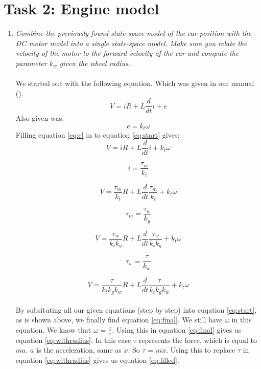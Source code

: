 \documentclass[final]{scrreprt} %
\begin{document}
\section{Task 2: Engine model}
\label{sec:mod3-tsk2}
\begin{enumerate}
\item \textit{Combine the previously found state-space model of the car position with the DC motor model into a single state-space model. Make sure you relate the velocity of the motor to the forward velocity of the car and compute the parameter $k_{w}$ given the wheel radius.}\\
\\
We started out with the following equation. Which was given in our manual (\cite{epo4-manual}).
\begin{equation}
V = iR + L\frac{d}{dt}i + e
\label{eq:start}
\end{equation}
Also given was:
\begin{equation}
e = k_t \omega
\label{eq:e}
\end{equation}
Filling equation \ref{eq:e} in to equation \ref{eq:start} gives: 
\begin{equation}
V = iR + L\frac{d}{dt}i + k_t \omega
\label{eq:1}
\end{equation}

\begin{equation}
i = \frac{\tau_m}{k_t}
\label{eq:2}
\end{equation}

\begin{equation}
V = \frac{\tau_m}{k_t}R + L\frac{d}{dt}\frac{\tau_m}{k_t} +  k_t \omega
\label{eq:3}
\end{equation}

\begin{equation}
\tau_m = \frac{\tau_w}{k_g}
\label{eq:4}
\end{equation}

\begin{equation}
V = \frac{\tau_w}{k_t k_g}R + L\frac{d}{dt}\frac{\tau_w}{k_t k_g} +  k_t \omega
\label{eq:5}
\end{equation}

\begin{equation}
\tau_w = \frac{\tau}{k_w}
\label{eq:6}
\end{equation}

\begin{equation}
V = \frac{\tau}{k_t k_g k_w}R + L\frac{d}{dt}\frac{\tau}{k_t k_g k_w} +  k_t \omega
\label{eq:final}
\end{equation}\\
By subsituting all our given equations (step by step) into euqation \ref{eq:start}, as is shown above, we finally find equation \ref{eq:final}. We still have $\omega$ in this equation. We know that $\omega$ = $\frac{\dot{x}}{r}$. Using this in equation \ref{eq:final} gives us equation \ref{eq:withradius}. In this case $\tau$ represents the force, which is equal to $ma$. $a$ is the acceleration, same as $\ddot{x}$. So $\tau$ = $m\ddot{x}$. Using this to replace $\tau$ in equation \ref{eq:withradius} gives us equation \ref{eq:filled}. 


\end{enumerate}
\end{document}
